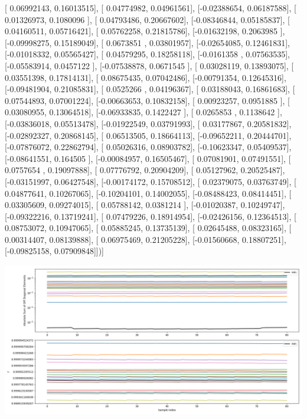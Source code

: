 \documentclass{article}
\begin{document}
       [ 0.06992143,  0.16013515],
       [ 0.04774982,  0.04961561],
       [-0.02388654,  0.06187588],
       [ 0.01326973,  0.1080096 ],
       [ 0.04793486,  0.20667602],
       [-0.08346844,  0.05185837],
       [ 0.04160511,  0.05716421],
       [ 0.05762258,  0.21815786],
       [-0.01632198,  0.2063985 ],
       [-0.09998275,  0.15189049],
       [ 0.0673851 ,  0.03801957],
       [-0.02654085,  0.12461831],
       [-0.01018332,  0.05565427],
       [ 0.04579295,  0.18258118],
       [-0.0161358 ,  0.07563535],
       [-0.05583914,  0.0457122 ],
       [-0.07538878,  0.0671545 ],
       [ 0.03028119,  0.13893075],
       [ 0.03551398,  0.17814131],
       [ 0.08675435,  0.07042486],
       [-0.00791354,  0.12645316],
       [-0.09481904,  0.21085831],
       [ 0.0525266 ,  0.04196367],
       [ 0.03188043,  0.16861683],
       [ 0.07544893,  0.07001224],
       [-0.00663653,  0.10832158],
       [ 0.00923257,  0.0951885 ],
       [ 0.03080955,  0.13064518],
       [-0.06933835,  0.1422427 ],
       [ 0.0265853 ,  0.1138642 ],
       [-0.03836018,  0.05513478],
       [-0.01922549,  0.03791993],
       [ 0.03177867,  0.20581832],
       [-0.02892327,  0.20868145],
       [ 0.06513505,  0.18664113],
       [-0.09652211,  0.20444701],
       [-0.07876072,  0.22862794],
       [ 0.05026316,  0.08903782],
       [-0.10623347,  0.05409537],
       [-0.08641551,  0.164505  ],
       [-0.00084957,  0.16505467],
       [ 0.07081901,  0.07491551],
       [ 0.0757654 ,  0.19097888],
       [ 0.07776792,  0.20904209],
       [ 0.05127962,  0.20525487],
       [-0.03151997,  0.06427548],
       [-0.00174172,  0.15708512],
       [ 0.02379075,  0.03763749],
       [ 0.04877641,  0.10267065],
       [-0.10204101,  0.14002055],
       [-0.08488423,  0.08414451],
       [ 0.03305609,  0.09274015],
       [ 0.05788142,  0.0381214 ],
       [-0.01020387,  0.10249747],
       [-0.09322216,  0.13719241],
       [ 0.07479226,  0.18914954],
       [-0.02426156,  0.12364513],
       [ 0.08753072,  0.10947065],
       [ 0.05885245,  0.13735139],
       [ 0.02645488,  0.08323165],
       [ 0.00314407,  0.08139888],
       [ 0.06975469,  0.21205228],
       [-0.01560668,  0.18807251],
       [-0.09825158,  0.07909848]])]
\begin{center}
\includegraphics[scale=.9]{report_pickled_controls175/control_dpn_all.png}

\end{center}
\end{document}
